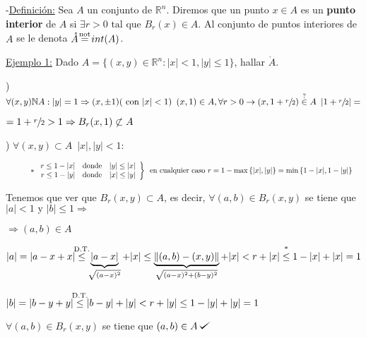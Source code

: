 \documentclass[10pt, titlepage]{article}
\def\checkmark{\tikz\fill[scale=0.4](0,.35) -- (.25,0) -- (1,.7) -- (.25,.15) -- cycle;}
\newcommand{\eqc}[1]{\stackrel{\mathclap{\normalfont\mbox{\scriptsize{#1}}}}{=}}
\newcommand{\leqc}[1]{\stackrel{\mathclap{\normalfont\mbox{\scriptsize{#1}}}}{\leq}}
\newcommand{\inc}[1]{\stackrel{\mathclap{\normalfont\mbox{\scriptsize{#1}}}}{\in}}
\newcommand{\R}{\mathbb{R}}
\newcommand{\N}{\mathbb{N}}
\newcommand{\spac}{\, \, \,}
\newcommand{\definicion}{\noindent-\underline{Definición:} }
\newcommand{\dindent}{\indent\indent}
\begin{document}

\definicion Sea $A$ un conjunto de $\R^n$. Diremos que un punto $x \in A$  es un \textbf{punto interior} 
de $A$ si $\exists r > 0 \text{ tal que } B_r (x) \in A$. Al conjunto de puntos interiores de $A$ se le denota $ 
\mathring{A} \eqc{not} int(A)$.
\vspace{3mm}

\underline{Ejemplo 1:} Dado $A = \{(x, y) \in \R^n : |x|<1, |y| \leq 1 \}$, hallar $\mathring{A}$.
\vspace{3mm}

\dindent 1) $\forall (x, y) \N A : |y| = 1 \Rightarrow (x, \pm 1) (\text{ con } |x| < 1) \spac (x, 1) \in A, \forall 
r > 0 \rightarrow (x, 1 + \sfrac{r}{2}) \inc{?} A \spac |1 + \sfrac{r}{2}| =$

\dindent $= 1 + \sfrac{r}{2} > 1 \Rightarrow B_r(x, 1) \not\subset A$
\vspace{3mm}

\dindent 2) $\forall (x, y) \subset A \spac |x|, |y| < 1$:

 \[
\dindent *\left. \begin{array}{rccc}

r \leq 1- |x| & \text{donde} & |y| \leq |x|\\
r \leq 1- |y| & \text{donde} & |x| \leq |y|

\end{array}\right \}\spac\parbox{10cm}{en cualquier caso $r = 1 - \max{\{|x|, |y|\}} = \min{\{1 - |x|, 
 1 - |y|\}}$}
\]
\vspace{3mm}

Tenemos que ver que $B_r (x, y) \subset A$, es decir, $\forall (a, b) \in B_r(x, y)$ se tiene que $|a| < 1 
\text{ y } |b| \leq 1 \Rightarrow$

$\Rightarrow (a, b) \in A$
\vspace{3mm}

$|a| = |a - x + x| \leqc{D.T.} \underbrace{|a-x|}_{\sqrt{(a - x)^2}} + |x| \leq \underbrace{\|(a, b) - 
(x, y)\|}_{\sqrt{(a -x)^2 + (b - y)^2}} + |x| < r + |x| \leqc{*} 1 - |x| +|x| =1$
\vspace{3mm}

$|b| = |b - y + y| \leqc{D.T.} |b - y| +|y| < r + |y| \leq 1 - |y| + |y| = 1$
\vspace{3mm}

$\forall (a, b) \in B_r(x, y)$ se tiene que $(a, b) \in A \, \checkmark$
\vspace{5mm}

\end{document}

